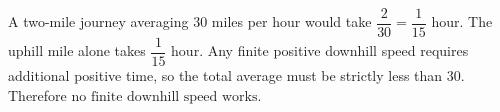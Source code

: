 A two-mile journey averaging $30$ miles per hour would take $\dfrac{2}{30}=\dfrac{1}{15}$ hour. The uphill mile alone takes $\dfrac{1}{15}$ hour. Any finite positive downhill speed requires additional positive time, so the total average must be strictly less than $30$. Therefore $\boxed{\text{no finite downhill speed works}}$.
